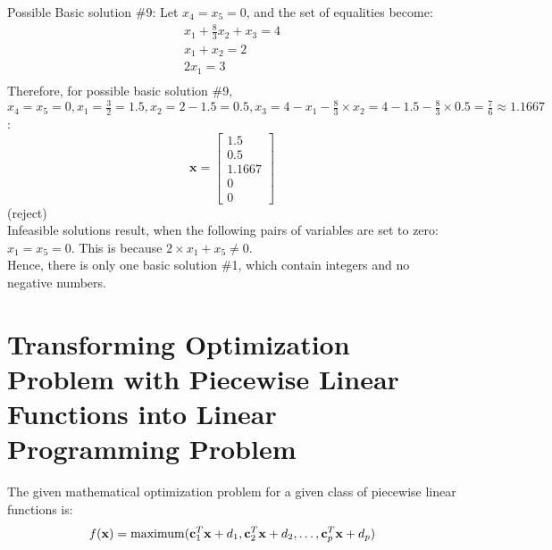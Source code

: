 \documentclass[letter,12pt]{article}
\begin{document}
Possible Basic solution \#9:
Let $x_{4} = x_{5} = 0$, and the set of equalities become:
\begin{eqnarray*}
x_{1} + \frac{8}{3}x_{2} + x_{3} = 4 \\
x_{1} + x_{2} = 2 \\
2x_{1} = 3 \\
\end{eqnarray*}
Therefore, for possible basic solution \#9, $x_{4} = x_{5} = 0, x_{1} = \frac{3}{2} = 1.5, x_{2} = 2 - 1.5 = 0.5, x_{3} = 4 - x_{1} - \frac{8}{3} \times x_{2} = 4 - 1.5 - \frac{8}{3} \times 0.5 = \frac{7}{6} \approx 1.1667$:
\begin{equation}
\mathbf{x} = \left[
	\begin{array}{c}
	1.5 \\ 0.5 \\ 1.1667 \\ 0 \\ 0
	\end{array}
	\right]
\end{equation}
(reject) \\

Infeasible solutions result, when the following pairs of variables are set to zero: $x_{1} = x_{5} = 0$. This is because $2\times x_{1} + x_{5} \neq 0$. \\

Hence, there is only one basic solution \#1, which contain integers and no negative numbers.


\section{Transforming Optimization Problem with Piecewise Linear Functions into Linear Programming Problem}
\label{sec:optimizationproblemtransformation}

The given mathematical optimization problem for a given class of piecewise linear functions is:
\begin{eqnarray*}
f({\mathbf{x}}) = {\rm maximum} (\mathbf{c}^{T}_{1}\mathbf{x} + d_{1}, \mathbf{c}^{T}_{2}\mathbf{x} + d_{2}, \dots, \mathbf{c}^{T}_{p}\mathbf{x} + d_{p})
\end{eqnarray*}
\end{document}
